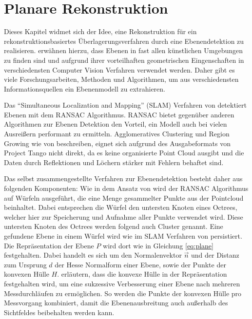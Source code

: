 \section{Planare Rekonstruktion} \label{sec:plane-reconstruction}

Dieses Kapitel widmet sich der Idee, eine Rekonstruktion für ein rekonstruktionsbasiertes Überlagerungsverfahren durch eine Ebenendetektion zu realisieren. \citet{yang2010plane} erwähnen hierzu, dass Ebenen in fast allen künstlichen Umgebungen zu finden sind und aufgrund ihrer vorteilhaften geometrischen Eingenschaften in verschiedensten Computer Vision Verfahren verwendet werden. Daher gibt es viele Forschungsarbeiten, Methoden und Algorithmen, um aus verschiedensten Informationsquellen ein Ebenenmodell zu extrahieren.

Das \enquote{Simultaneous Localization and Mapping} (SLAM) Verfahren von \citet{trevor2012planar} detektiert Ebenen mit dem RANSAC Algorithmus. RANSAC bietet gegenüber anderen Algorithmen zur Ebenen Detektion den Vorteil, ein Modell auch bei vielen Ausreißern performant zu ermitteln. Agglomeratives Clustering und Region Growing wie von \citet{feng2014fast} beschreiben, eignet sich aufgrund des Ausgabeformats von Project Tango nicht direkt, da es keine organisierte Point Cloud ausgibt und die Daten durch Reflektionen und Löchern stärker mit Fehlern behaftet sind. 

Das selbst zusammengestellte Verfahren zur Ebenendetektion besteht daher aus folgenden Komponenten: Wie in dem Ansatz von \citet{yang2010plane} wird der RANSAC Algorithmus auf Würfeln ausgeführt, die eine Menge gesammelter Punkte aus der Pointcloud beinhaltet. Dabei entsprechen die Würfel den untersten Knoten eines Octrees, welcher hier zur Speicherung und Aufnahme aller Punkte verwendet wird. Diese untersten Knoten des Octrees werden folgend auch Cluster genannt. Eine gefundene Ebene in einem Würfel wird wie im SLAM Verfahren von \citet{trevor2012planar} persistiert. Die Repräsentation der Ebene \(P\) wird dort wie in Gleichung \ref{eq:plane} festgehalten. Dabei handelt es sich um den Normalenvektor \(\vec{n}\) und der Distanz zum Ursprung \(d\) der Hesse Normalform einer Ebene, sowie der Punkte der konvexen Hülle \(H\). \citet{trevor2012planar} erläutern, dass die konvexe Hülle in der Repräsentation festgehalten wird, um eine sukzessive Verbesserung einer Ebene nach mehreren Messdurchläufen zu ermöglichen. So werden die Punkte der konvexen Hülle pro Messvorgang kombiniert, damit die Ebenenausbreitung auch außerhalb des Sichtfeldes beibehalten werden kann. 

